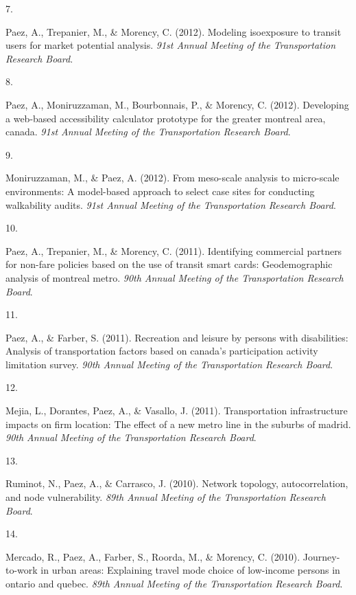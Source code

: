 \documentclass[10pt,a4paper,]{twentysecondcv}
\newlength{\csllabelwidth}
\newcommand{\CSLLeftMargin}[1]{\parbox[t]{\csllabelwidth}{#1}}
\newcommand{\CSLRightInline}[1]{\parbox[t]{\linewidth - \csllabelwidth}{#1}}
\begin{document}
\leavevmode{}%
\CSLLeftMargin{7. }%
\CSLRightInline{Paez, A., Trepanier, M., \& Morency, C. (2012). Modeling
isoexposure to transit users for market potential analysis. \emph{91st
Annual Meeting of the Transportation Research Board}.}

\leavevmode{}%
\CSLLeftMargin{8. }%
\CSLRightInline{Paez, A., Moniruzzaman, M., Bourbonnais, P., \& Morency,
C. (2012). Developing a web-based accessibility calculator prototype for
the greater montreal area, canada. \emph{91st Annual Meeting of the
Transportation Research Board}.}

\leavevmode{}%
\CSLLeftMargin{9. }%
\CSLRightInline{Moniruzzaman, M., \& Paez, A. (2012). From meso-scale
analysis to micro-scale environments: A model-based approach to select
case sites for conducting walkability audits. \emph{91st Annual Meeting
of the Transportation Research Board}.}

\leavevmode{}%
\CSLLeftMargin{10. }%
\CSLRightInline{Paez, A., Trepanier, M., \& Morency, C. (2011).
Identifying commercial partners for non-fare policies based on the use
of transit smart cards: Geodemographic analysis of montreal metro.
\emph{90th Annual Meeting of the Transportation Research Board}.}

\leavevmode{}%
\CSLLeftMargin{11. }%
\CSLRightInline{Paez, A., \& Farber, S. (2011). Recreation and leisure
by persons with disabilities: Analysis of transportation factors based
on canada's participation activity limitation survey. \emph{90th Annual
Meeting of the Transportation Research Board}.}

\leavevmode{}%
\CSLLeftMargin{12. }%
\CSLRightInline{Mejia, L., Dorantes, Paez, A., \& Vasallo, J. (2011).
Transportation infrastructure impacts on firm location: The effect of a
new metro line in the suburbs of madrid. \emph{90th Annual Meeting of
the Transportation Research Board}.}

\leavevmode{}%
\CSLLeftMargin{13. }%
\CSLRightInline{Ruminot, N., Paez, A., \& Carrasco, J. (2010). Network
topology, autocorrelation, and node vulnerability. \emph{89th Annual
Meeting of the Transportation Research Board}.}

\leavevmode{}%
\CSLLeftMargin{14. }%
\CSLRightInline{Mercado, R., Paez, A., Farber, S., Roorda, M., \&
Morency, C. (2010). Journey-to-work in urban areas: Explaining travel
mode choice of low-income persons in ontario and quebec. \emph{89th
Annual Meeting of the Transportation Research Board}.}
\end{document}
